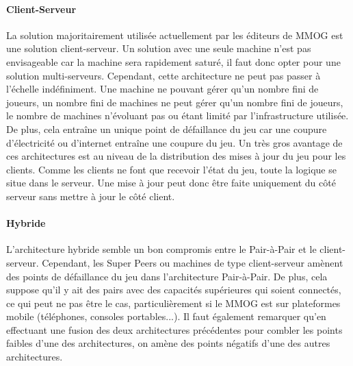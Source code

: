 \paragraph{Client-Serveur\\}
La solution majoritairement utilisée actuellement par les éditeurs de MMOG est une solution client-serveur.
Un solution avec une seule machine n'est pas envisageable car la machine sera rapidement saturé, il faut donc opter pour une solution multi-serveurs.
Cependant, cette architecture ne peut pas passer à l'échelle indéfiniment.
Une machine ne pouvant gérer qu'un nombre fini de joueurs, un nombre fini de machines ne peut gérer qu'un nombre fini de joueurs, le nombre de machines n'évoluant pas ou étant limité par l'infrastructure utilisée.
De plus, cela entraîne un unique point de défaillance du jeu car une coupure d'électricité ou d'internet entraîne une coupure du jeu.
Un très gros avantage de ces architectures est au niveau de la distribution des mises à jour du jeu pour les clients.
Comme les clients ne font que recevoir l'état du jeu, toute la logique se situe dans le serveur.
Une mise à jour peut donc être faite uniquement du côté serveur sans mettre à jour le côté client.

\paragraph{Hybride\\}
L'architecture hybride semble un bon compromis entre le Pair-à-Pair et le client-serveur.
Cependant, les Super Peers ou machines de type client-serveur amènent des points de défaillance du jeu dans l'architecture Pair-à-Pair.
De plus, cela suppose qu'il y ait des pairs avec des capacités supérieures qui soient connectés, ce qui peut ne pas être le cas, particulièrement si le MMOG est sur plateformes mobile (téléphones, consoles portables...).
Il faut également remarquer qu'en effectuant une fusion des deux architectures précédentes pour combler les points faibles d'une des architectures, on amène des points négatifs d'une des autres architectures.

\newpage
